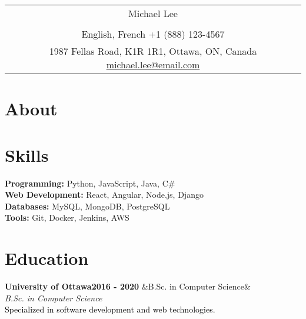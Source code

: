 \documentclass[a4paper,8pt]{article}
\newcommand{\entry}[4]{
    \noindent\textbf{\color{headerColor}#1}\hfill\textbf{\color{subHeaderColor}#2}
    \ifx&#3&\else\\\noindent\textit{\color{subHeaderColor}#3}\fi
      \\#4
    \vspace{5pt} %
  }
\begin{document}
  \pagestyle{empty}
  
  \begin{tabularx}{\linewidth}{@{} C @{}}
  
  \color{headerColor} \Huge{Michael Lee} \\[6pt]\\
  \textcolor{subHeaderColor}{\raisebox{-0.05\height}{\faLanguage} English, French }
\textcolor{subHeaderColor}{\raisebox{-0.05\height}{\faMobile} +1 (888) 123-4567 }
\textcolor{subHeaderColor}{{\href{https://linkedin.com/michaellee}{\raisebox{-0.05\height}{\faLinkedin}}} }
\\\textcolor{subHeaderColor}{\raisebox{-0.05\height}{\faMapMarker} 1987 Fellas Road, K1R 1R1, Ottawa, ON, Canada          }
\textcolor{subHeaderColor}{{\href{mailto:michael.lee@email.com}{\raisebox{-0.05\height}{\faEnvelope} michael.lee@email.com}} }
\end{tabularx}
\color{headerColor}\section{About}\vspace{1ex}\color{black}{Experienced software developer with a strong background in full-stack development, especially in web technologies.
Eager to apply my expertise in a challenging and innovative environment.}\color{headerColor}\section{Skills}
\vspace{1ex}
  \color{headerColor}\textbf{Programming:} \color{black} Python, JavaScript, Java, C\#
\\
  \color{headerColor}\textbf{Web Development:} \color{black} React, Angular, Node.js, Django
\\
  \color{headerColor}\textbf{Databases:} \color{black} MySQL, MongoDB, PostgreSQL
\\
  \color{headerColor}\textbf{Tools:} \color{black} Git, Docker, Jenkins, AWS

  \color{headerColor}\section{Education}
\vspace{1ex}
  \entry{University of Ottawa}
      {2016 - 2020}
      {B.Sc. in Computer Science}
      {\textcolor{black}{Specialized in software development and web technologies.}}
\end{document}
